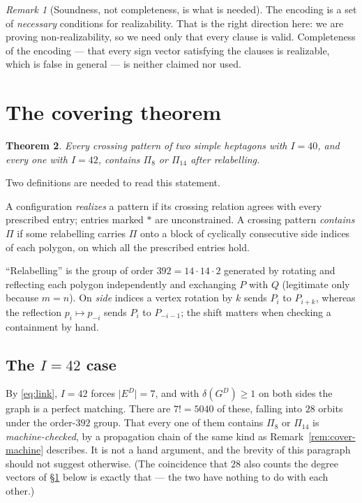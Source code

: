 \documentclass[11pt,a4paper]{article}
\theoremstyle{plain}
\newtheorem{theorem}{Theorem}[section]
\theoremstyle{definition}
\theoremstyle{remark}
\newtheorem{remark}[theorem]{Remark}
\newcommand{\GD}{G^{D}}
\newcommand{\ED}{E^{D}}
\begin{document}
\begin{remark}[Soundness, not completeness, is what is needed]
The encoding is a set of \emph{necessary} conditions for realizability. That is
the right direction here: we are proving non-realizability, so we need only that
every clause is valid. Completeness of the encoding --- that every sign vector
satisfying the clauses is realizable, which is false in general --- is neither
claimed nor used.
\end{remark}

\section{The covering theorem}\label{sec:cover}

\begin{theorem}\label{thm:cover}
Every crossing pattern of two simple heptagons with $I=40$, and every one with
$I=42$, contains $\Pi_8$ or $\Pi_{14}$ after relabelling.
\end{theorem}

Two definitions are needed to read this statement.

A configuration \emph{realizes} a pattern if its crossing relation agrees with
every prescribed entry; entries marked $\ast$ are unconstrained. A crossing
pattern \emph{contains} $\Pi$ if some relabelling carries $\Pi$ onto a block of
cyclically consecutive side indices of each polygon, on which all the
prescribed entries hold.

``Relabelling'' is the group of order $392=14\cdot 14\cdot 2$ generated by
rotating and reflecting each polygon independently and exchanging $P$ with $Q$
(legitimate only because $m=n$). On \emph{side} indices a vertex rotation by $k$
sends $P_i$ to $P_{i+k}$, whereas the reflection $p_i\mapsto p_{-i}$ sends $P_i$
to $P_{-i-1}$; the shift matters when checking a containment by hand.

\subsection{The $I=42$ case}

By \eqref{eq:link}, $I=42$ forces $\lvert \ED\rvert=7$, and with
$\delta(\GD)\ge1$ on both sides the graph is a perfect matching. There are
$7!=5040$ of these, falling into $28$ orbits under the order-$392$ group. That
every one of them contains $\Pi_8$ or $\Pi_{14}$ is \emph{machine-checked}, by a
propagation chain of the same kind as Remark~\ref{rem:cover-machine} describes.
It is not a hand argument, and the brevity of this paragraph should not suggest
otherwise. (The coincidence that $28$ also counts the degree vectors of
\S\ref{sec:cover} below is exactly that --- the two have nothing to do with each
other.)
\end{document}
